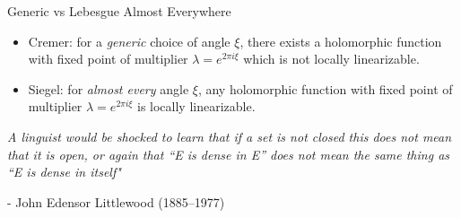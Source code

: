 \begin{frame}{Generic vs Lebesgue Almost Everywhere}
    \begin{itemize}
        \item Cremer: for a \textit{generic} choice of angle $\xi$, there exists a holomorphic function with fixed point of multiplier $\lambda = e^{2\pi i \xi}$ which is not locally linearizable.
        \item Siegel: for \textit{almost every} angle $\xi$, any holomorphic function with fixed point of multiplier $\lambda = e^{2\pi i \xi}$ is locally linearizable.
    \end{itemize}
    
     \par\vspace{1em}
     
    \textit{A linguist would be shocked to learn that if a set is not closed this does not mean that it is open, or again that “E is dense in E” does not mean the same thing as “E is dense in itself"}
    
     \par\vspace{1em}
    - John Edensor Littlewood (1885–1977)
\end{frame}





















